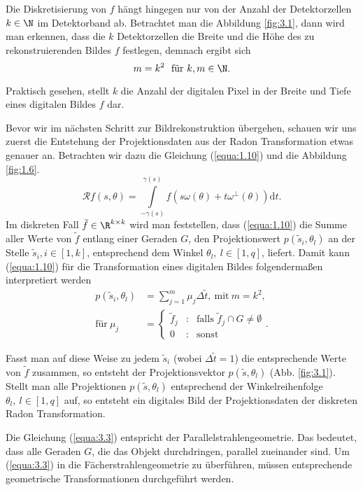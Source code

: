 Die Diskretisierung von $f$ hängt hingegen nur von der Anzahl der Detektorzellen $k \in \N$ im Detektorband ab. Betrachtet man die Abbildung \ref{fig:3.1}, dann wird man erkennen, dass die $k$ Detektorzellen die Breite und die Höhe des zu rekonstruierenden Bildes $f$ festlegen, demnach ergibt sich
\begin{equation}
	m = k^2 \ \ \mbox{für} \ k, m \in \N.
	\label{equa:3.2}
\end{equation}
\begin{Bemerkung}
	Praktisch gesehen, stellt $k$ die Anzahl der digitalen Pixel in der Breite und Tiefe eines digitalen Bildes $f$ dar.
	\label{bem:6}
\end{Bemerkung}
Bevor wir im nächsten Schritt zur Bildrekonstruktion übergehen, schauen wir uns zuerst die Entstehung der Projektionsdaten aus der Radon Transformation etwas genauer an. Betrachten wir dazu die Gleichung (\ref{equa:1.10}) und die Abbildung \ref{fig:1.6}.
\[ \mathcal{R}f(s,\theta) = \int\limits_{-\gamma(s)}^{\gamma(s)} f(s\omega(\theta) + t\omega^{\perp}(\theta))\mbox{d}t. \]
Im diskreten Fall $\tilde{f} \in \R^{k \times k}$ wird man feststellen, dass (\ref{equa:1.10}) die Summe aller Werte von $\tilde{f}$ entlang einer Geraden $G$, den Projektionswert $p(\tilde{s}_i, \theta_l)$ an der Stelle $\tilde{s}_i, i \in [1,k]$, entsprechend dem Winkel $\theta_l, \ l \in [1,q] $, liefert. Damit kann (\ref{equa:1.10}) für die Transformation eines digitalen Bildes folgendermaßen interpretiert werden
\begin{equation}
	\begin{split}
		p(\tilde{s}_i, \theta_l) & = \sum \limits_{j = 1}^{m} \mu_j \Delta\tilde{t}, \ \mbox{mit} \ m = k^2, \\
		\mbox{für} \ \mu_j & = \left\{ \begin{matrix}
							\tilde{f}_j & : & \mbox{falls } \tilde{f}_j\cap G \neq \emptyset \\ 
							0 & : & \mbox{sonst}
						\end{matrix}.\right.
	\end{split}
	\label{equa:3.3}
\end{equation}

Fasst man auf diese Weise zu jedem $\tilde{s}_i$ (wobei $\Delta\tilde{t} = 1$) die entsprechende Werte von $\tilde{f}$ zusammen, so entsteht der Projektionsvektor $p(\tilde{s},\theta_l)$ (Abb. \ref{fig:3.1}). Stellt man alle Projektionen $p(\tilde{s}, \theta_l)$ entsprechend der Winkelreihenfolge $\theta_l, \ l \in [1,q]$ auf, so entsteht ein digitales Bild der Projektionsdaten der diskreten Radon Transformation.
\begin{Bemerkung}
	Die Gleichung (\ref{equa:3.3}) entspricht der Parallelstrahlengeometrie. Das bedeutet, dass alle Geraden $G$, die das Objekt durchdringen, parallel zueinander sind. Um (\ref{equa:3.3}) in die Fächerstrahlengeometrie zu überführen, müssen entsprechende geometrische Transformationen durchgeführt werden.
	\label{bem:7}
\end{Bemerkung}


